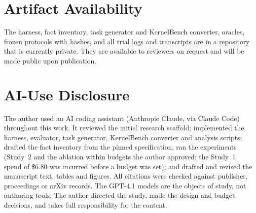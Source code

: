 \documentclass[conference]{IEEEtran}
\begin{document}
\section*{Artifact Availability}
The harness, fact inventory, task generator and KernelBench converter, oracles, frozen protocols with hashes, and all trial logs and transcripts are in a repository that is currently private. They are available to reviewers on request and will be made public upon publication.

\section*{AI-Use Disclosure}
The author used an AI coding assistant (Anthropic Claude, via Claude Code) throughout this work. It reviewed the initial research scaffold; implemented the harness, evaluator, task generator, KernelBench converter and analysis scripts; drafted the fact inventory from the pinned specification; ran the experiments (Study~2 and the ablation within budgets the author approved; the Study~1 spend of \$6.80 was incurred before a budget was set); and drafted and revised the manuscript text, tables and figures. All citations were checked against publisher, proceedings or arXiv records. The GPT-4.1 models are the objects of study, not authoring tools. The author directed the study, made the design and budget decisions, and takes full responsibility for the content.



\end{document}
